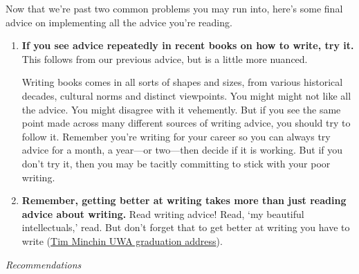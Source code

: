 \documentclass[11pt,letter]{article}
\begin{document}
Now that we're past two common problems you may run into, here's some final advice on implementing all the advice you're reading.
\begin{enumerate}
\item {\bf If you see advice repeatedly in recent books on how to write, try it.} This follows from our previous advice, but is a little more nuanced. 

Writing books comes in all sorts of shapes and sizes, from various historical decades, cultural norms and distinct viewpoints. You might might not like all the advice. You might disagree with it vehemently. But if you see the same point made across many different sources of writing advice, you should try to follow it. Remember you're writing for your career so you can always try advice for a month, a year---or two---then decide if it is working. But if you don't try it, then you may be tacitly committing to stick with your poor writing. 
\item {\bf Remember, getting better at writing takes more than just reading advice about writing.} Read writing advice! Read,  `my beautiful intellectuals,' read.  But don't forget that to get better at writing you have to write (\href{https://www.youtube.com/watch?v=yoEezZD71sc}{Tim Minchin UWA graduation address}). %
\end{enumerate}


\emph{Recommendations}
\end{document}

